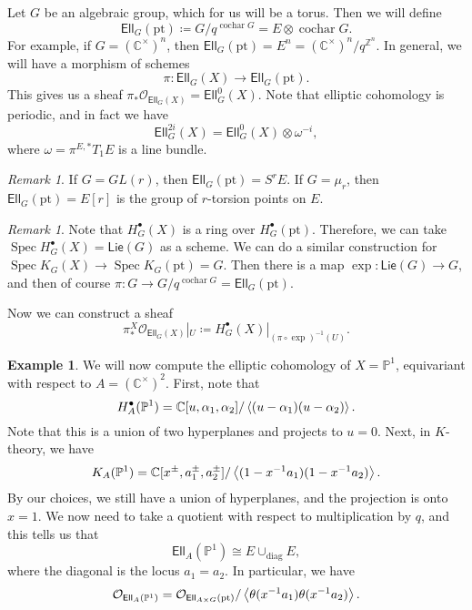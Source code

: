 \documentclass[leqno, openany]{memoir}
\theoremstyle{definition}
\newtheorem{exm}[thm]{Example}
\theoremstyle{remark}
\newtheorem{rmk}[thm]{Remark}
\theoremstyle{plain}
\theoremstyle{definition}
\theoremstyle{remark}
\newcommand{\C}{\mathbb{C}}
\newcommand{\Z}{\mathbb{Z}}
\renewcommand{\P}{\mathbb{P}}
\newcommand{\mc}[1]{\mathcal{#1}}
\newcommand{\mr}[1]{\mathrm{#1}}
\newcommand{\ms}[1]{\mathsf{#1}}
\newcommand{\on}[1]{\operatorname{#1}}
\DeclareMathOperator{\Spec}{Spec}
\begin{document}
Let $G$ be an algebraic group, which for us will be a torus. Then we will define
\[ \ms{Ell}_G(\mr{pt}) \coloneqq G / q^{\on{cochar} G} = E \otimes \on{cochar} G. \]
For example, if $G = (\C^{\times})^n$, then $\ms{Ell}_G(\mr{pt}) = E^n = (\C^{\times})^n / q^{\Z^n}$. In general, we will have a morphism of schemes
\[ \pi \colon \ms{Ell}_G(X) \to \ms{Ell}_G(\mr{pt}). \]
This gives us a sheaf $\pi_* \mc{O}_{\ms{Ell}_G(X)} = \ms{Ell}_G^0(X)$. Note that elliptic cohomology is periodic, and in fact we have
\[ \ms{Ell}_G^{2i}(X) = \ms{Ell}_G^0(X) \otimes \omega^{-i}, \]
where $\omega = \pi^{E,*} T_1 E$ is a line bundle.

\begin{rmk}
    If $G = GL(r)$, then $\ms{Ell}_G(\mr{pt}) = S^r E$. If $G = \mu_r$, then $\ms{Ell}_G(\mr{pt}) = E[r]$ is the group of $r$-torsion points on $E$.
\end{rmk}

\begin{rmk}
    Note that $H_G^{\bullet}(X)$ is a ring over $H_G^{\bullet}(\mr{pt})$. Therefore, we can take $\Spec H_G^{\bullet}(X) = \ms{Lie}(G)$ as a scheme. We can do a similar construction for $\Spec K_G(X) \to \Spec K_G(\mr{pt}) = G$. Then there is a map $\exp \colon \ms{Lie}(G) \to G$, and then of course $\pi \colon G \to G / q^{\on{cochar} G} = \ms{Ell}_G(\mr{pt})$.
\end{rmk}

Now we can construct a sheaf
\[ \pi_*^X \mc{O}_{\ms{Ell}_G(X)} |_U \coloneqq H_G^{\bullet}(X) |_{(\pi \circ \exp)^{-1}(U)}. \]

\begin{exm}
    We will now compute the elliptic cohomology of $X = \P^1$, equivariant with respect to $A = (\C^{\times})^2$. First, note that
    \[ H_A^{\bullet}(\P^1) = \C[u, \alpha_1, \alpha_2] / \ev{(u-\alpha_1)(u-\alpha_2)}. \]
    Note that this is a union of two hyperplanes and projects to $u = 0$. Next, in $K$-theory, we have
    \[ K_A(\P^1) = \C[x^{\pm}, a_1^{\pm}, a_2^{\pm}] / \ev{(1-x^{-1}a_1)(1-x^{-1}a_2)}. \]
    By our choices, we still have a union of hyperplanes, and the projection is onto $x = 1$. We now need to take a quotient with respect to multiplication by $q$, and this tells us that
    \[ \ms{Ell}_A(\P^1) \cong E \cup_{\mr{diag}} E, \]
    where the diagonal is the locus $a_1 = a_2$. In particular, we have
    \[ \mc{O}_{\ms{Ell}_A(\P^1)} = \mc{O}_{\ms{Ell}_{A \times G}(\mr{pt})} / \ev{\theta(x^{-1} a_1) \theta(x^{-1} a_2)}. \]
\end{exm}
\end{document}
